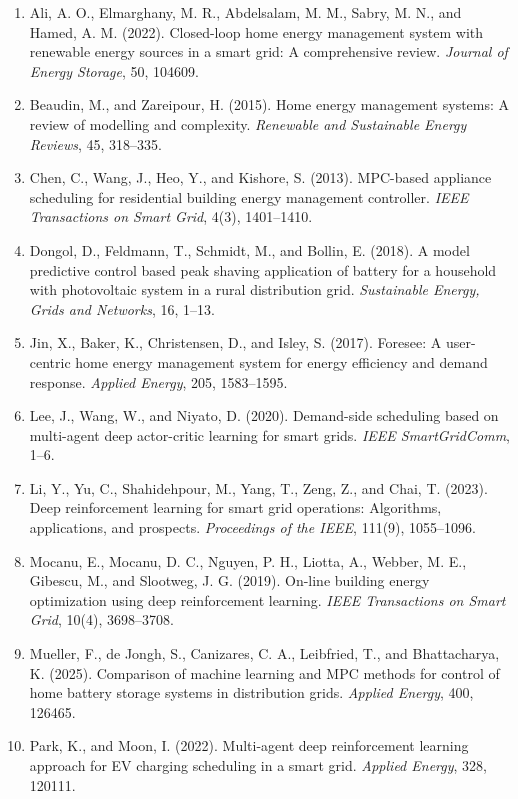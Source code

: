 \documentclass[12pt,a4paper]{ctexart}
\begin{document}
\begin{enumerate}
  \item Ali, A. O., Elmarghany, M. R., Abdelsalam, M. M., Sabry, M. N., and Hamed, A. M. (2022). Closed-loop home energy management system with renewable energy sources in a smart grid: A comprehensive review. \textit{Journal of Energy Storage}, 50, 104609.
  \item Beaudin, M., and Zareipour, H. (2015). Home energy management systems: A review of modelling and complexity. \textit{Renewable and Sustainable Energy Reviews}, 45, 318--335.
  \item Chen, C., Wang, J., Heo, Y., and Kishore, S. (2013). MPC-based appliance scheduling for residential building energy management controller. \textit{IEEE Transactions on Smart Grid}, 4(3), 1401--1410.
  \item Dongol, D., Feldmann, T., Schmidt, M., and Bollin, E. (2018). A model predictive control based peak shaving application of battery for a household with photovoltaic system in a rural distribution grid. \textit{Sustainable Energy, Grids and Networks}, 16, 1--13.
  \item Jin, X., Baker, K., Christensen, D., and Isley, S. (2017). Foresee: A user-centric home energy management system for energy efficiency and demand response. \textit{Applied Energy}, 205, 1583--1595.
  \item Lee, J., Wang, W., and Niyato, D. (2020). Demand-side scheduling based on multi-agent deep actor-critic learning for smart grids. \textit{IEEE SmartGridComm}, 1--6.
  \item Li, Y., Yu, C., Shahidehpour, M., Yang, T., Zeng, Z., and Chai, T. (2023). Deep reinforcement learning for smart grid operations: Algorithms, applications, and prospects. \textit{Proceedings of the IEEE}, 111(9), 1055--1096.
  \item Mocanu, E., Mocanu, D. C., Nguyen, P. H., Liotta, A., Webber, M. E., Gibescu, M., and Slootweg, J. G. (2019). On-line building energy optimization using deep reinforcement learning. \textit{IEEE Transactions on Smart Grid}, 10(4), 3698--3708.
  \item Mueller, F., de Jongh, S., Canizares, C. A., Leibfried, T., and Bhattacharya, K. (2025). Comparison of machine learning and MPC methods for control of home battery storage systems in distribution grids. \textit{Applied Energy}, 400, 126465.
  \item Park, K., and Moon, I. (2022). Multi-agent deep reinforcement learning approach for EV charging scheduling in a smart grid. \textit{Applied Energy}, 328, 120111.

\end{enumerate}
\end{document}
